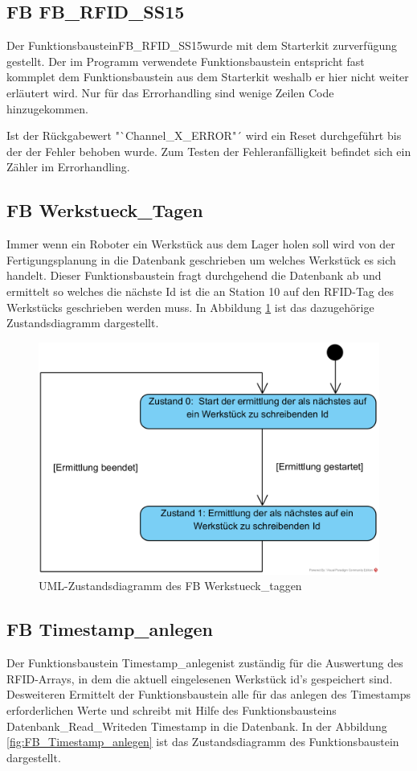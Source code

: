 \subsection{FB FB\_RFID\_SS15}
Der Funktionsbaustein\glqq FB\_RFID\_SS15\grqq wurde mit dem Starterkit zurverfügung gestellt. Der im Programm verwendete Funktionsbaustein entspricht fast kommplet dem Funktionsbaustein aus dem Starterkit weshalb er hier nicht weiter erläutert wird. Nur für das Errorhandling sind wenige Zeilen Code hinzugekommen. 

Ist der Rückgabewert "`Channel\_X\_ERROR"´ wird ein Reset durchgeführt bis der der Fehler behoben wurde. Zum Testen der Fehleranfälligkeit befindet sich ein Zähler im Errorhandling. 

\subsection{FB Werkstueck\_Tagen}
Immer wenn ein Roboter ein Werkstück aus dem Lager holen soll wird von der Fertigungsplanung in die Datenbank geschrieben um welches Werkstück es sich handelt. Dieser Funktionsbaustein fragt durchgehend die Datenbank ab und ermittelt so welches die nächste Id ist die an Station 10 auf den RFID-Tag des Werkstücks geschrieben werden muss. In Abbildung \ref{fig:FB_Werkstueck_taggen} ist das dazugehörige Zustandsdiagramm dargestellt.
\begin{figure}[h]
	    \centering
	    \includegraphics[width=0.7\linewidth]{Bilder/Zustandsdiagramme/taggen.png}
        \caption{UML-Zustandsdiagramm des FB Werkstueck\_taggen}
        \label{fig:FB_Werkstueck_taggen}
\end{figure}

\subsection{FB Timestamp\_anlegen}\label{kap:FB_Timestamp}
Der Funktionsbaustein \glqq Timestamp\_anlegen\grqq  ist zuständig für die Auswertung des RFID-Arrays, in dem die aktuell eingelesenen Werkstück id's gespeichert sind. Desweiteren Ermittelt der Funktionsbaustein alle für das anlegen des Timestamps erforderlichen Werte und schreibt mit Hilfe des Funktionsbausteins \glqq Datenbank\_Read\_Write\grqq  den Timestamp in die Datenbank. In der Abbildung \ref{fig:FB_Timestamp_anlegen} ist das Zustandsdiagramm des Funktionsbaustein dargestellt. 


